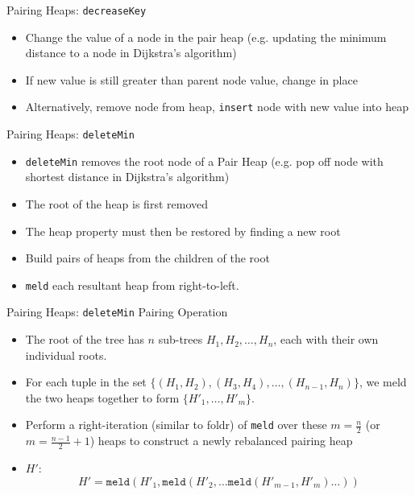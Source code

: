 \documentclass{beamer}
\begin{document}
\begin{frame}{Pairing Heaps: \texttt{decreaseKey}}
  \begin{itemize}
    \item Change the value of a node in the pair heap (e.g. updating the minimum distance to a node in Dijkstra's algorithm)
    \item If new value is still greater than parent node value, change in place
    \item Alternatively, remove node from heap, \texttt{insert} node with new value into heap
  \end{itemize}
\end{frame}

\begin{frame}{Pairing Heaps: \texttt{deleteMin}}
  \begin{itemize}
    \item \texttt{deleteMin} removes the root node of a Pair Heap (e.g. pop off node with shortest distance in Dijkstra's algorithm)
    \item The root of the heap is first removed
    \item The heap property must then be restored by finding a new root
    \item Build pairs of heaps from the children of the root
    \item \texttt{meld} each resultant heap from right-to-left.
  \end{itemize}
\end{frame}

\begin{frame}{Pairing Heaps: \texttt{deleteMin} Pairing Operation}
  \begin{itemize}
  \item The root of the tree has $n$ sub-trees $H_1, H_2, \dots, H_n$, each with their own individual roots. 
  \item For each tuple in the set $\{(H_1, H_2), (H_3, H_4), \dots, \allowbreak (H_{n-1}, H_n)\}$, we meld the two heaps together to form $\{H'_1, \dots, \allowbreak H'_m\}$.	
   \item Perform a right-iteration (similar to foldr) of \texttt{meld} over these $m=\frac{n}{2}$ (or $m=\frac{n-1}{2} + 1$) heaps to construct a newly rebalanced pairing heap
   \item $H'$:
	\begin{equation*}
	  H' = \mathtt{meld}(H'_1, \mathtt{meld}(H'_2, \dots \mathtt{meld}(H'_{m-1}, H'_m) \dots ))
	\end{equation*}
  \end{itemize}
\end{frame}
\end{document}
